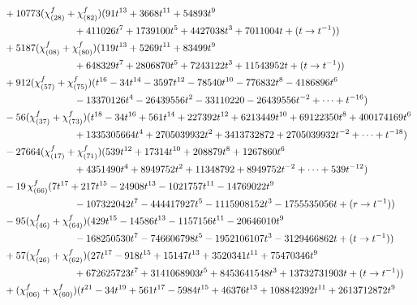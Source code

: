 \documentclass[letterpaper, 11pt]{article}
\newcommand{\nn}{\nonumber}
\begin{document}
{\begin{align}
    &+10773(\chi^f_{(28)}+\chi^f_{(82)})(91 t^{13}+3668 t^{11}+54893 t^9\nn\\
    &\hspace{2.5cm}+411026 t^7+1739100 t^5+4427038 t^3+7011004t+(t\rightarrow t^{-1}))\nn\\
    &+5187(\chi^f_{(08)}+\chi^f_{(80)})(119 t^{13}+5269 t^{11}+83499 t^9\nn\\
    &\hspace{2.5cm}+648329 t^7+2806870 t^5+7243122 t^3+11543952t+(t\rightarrow t^{-1}))\nn\\
    &+912(\chi^f_{(57)}+\chi^f_{(75)})(t^{16}-34 t^{14}-3597 t^{12}-78540 t^{10}-776832 t^8-4186896 t^6\nn\\
    &\hspace{2.5cm}-13370126 t^4-26439556t^2-33110220-26439556t^{-2}+\cdots+t^{-16})\nn\\
    &-56(\chi^f_{(37)}+\chi^f_{(73)})(t^{18}-34 t^{16}+561 t^{14}+227392 t^{12}+6213449 t^{10}+69122350 t^8+400174169 t^6\nn\\
    &\hspace{2.5cm}+1335305664t^4+2705039932 t^2+3413732872+2705039932 t^{-2}+\cdots+t^{-18})\nn\\
    &-27664(\chi^f_{(17)}+\chi^f_{(71)})(539 t^{12}+17314 t^{10}+208879 t^8+1267860 t^6\nn\\
    &\hspace{2.5cm}+4351490 t^4+8949752 t^2+11348792+8949752 t^{-2}+\cdots+539t^{-12})\nn\\
    &-19\,\chi^f_{(66)}(7 t^{17}+217 t^{15}-24908 t^{13}-1021757 t^{11}-14769022 t^9\nn\\
    &\hspace{2.5cm}-107322042 t^7-444417927t^5-1115908152 t^3-1755535056 t+(r\rightarrow t^{-1}))\nn\\
    &-95(\chi^f_{(46)}+\chi^f_{(64)})(429 t^{15}-14586 t^{13}-1157156 t^{11}-20646010 t^9\nn\\
    &\hspace{2.5cm}-168250530 t^7-746606798 t^5-1952106107t^3-3129466862t+(t\rightarrow t^{-1}))\nn\\
    &+57(\chi^f_{(26)}+\chi^f_{(62)})(27 t^{17}-918 t^{15}+15147 t^{13}+3520341 t^{11}+75470346 t^9\nn\\
    &\hspace{2.5cm}+672625723 t^7+3141068903t^5+8453641548 t^3+13732731903t+(t\rightarrow t^{-1}))\nn\\
    &+(\chi^f_{(06)}+\chi^f_{(60)})(t^{21}-34 t^{19}+561 t^{17}-5984 t^{15}+46376 t^{13}+108842392 t^{11}+2613712872t^9\nn\\

\end{align}}
\end{document}
